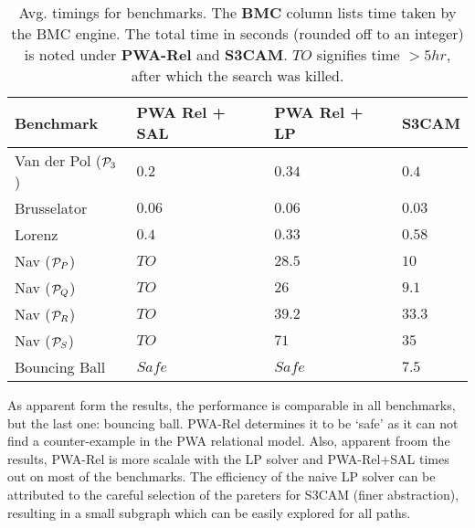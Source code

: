 \begin{table}[!htbp]
\centering
\caption{Avg. timings for benchmarks. The \textbf{BMC} column lists
time taken by the BMC engine. The total time in seconds (rounded off
to an integer) is noted under \textbf{PWA-Rel} and \textbf{S3CAM}.
$TO$ signifies time $>5hr$, after which the search was killed.}
\label{tab:res-rel}
\begin{tabular}{@{}llll@{}}
\toprule
    Benchmark & PWA Rel + SAL & PWA Rel + LP & S3CAM\\
\midrule
    Van der Pol ($\mathcal{P}_3$)   &$0.2$ & $0.34$ & $0.4$\\
    Brusselator               &$0.06$ & $0.06$ & $0.03$\\
    Lorenz                    &$0.4$ & $0.33$ & $0.58$\\
    Nav ($\mathcal{P}_P$)           &$TO$ & $28.5$  & $10$ \\%
    Nav ($\mathcal{P}_Q$)           &$TO$ & $26$   & $9.1$ \\%
    Nav ($\mathcal{P}_R$)           &$TO$ & $39.2$  & $33.3$\\
    Nav ($\mathcal{P}_S$)           &$TO$ & $71$  & $35$\\
    Bouncing Ball             &$Safe$ & $Safe$  & $7.5$\\

\bottomrule
\end{tabular}
\end{table}


As apparent form the results, the performance is comparable in all
benchmarks, but the last one: bouncing ball. PWA-Rel determines it to
be `safe' as it can not find a counter-example in the PWA relational
model. Also, apparent froom the results, PWA-Rel is more scalale with
the LP solver and PWA-Rel+SAL times out on most of the benchmarks.
The efficiency of the naive LP solver can be attributed to the careful
selection of the pareters for S3CAM (finer abstraction), resulting in
a small subgraph which can be easily explored for all paths.

